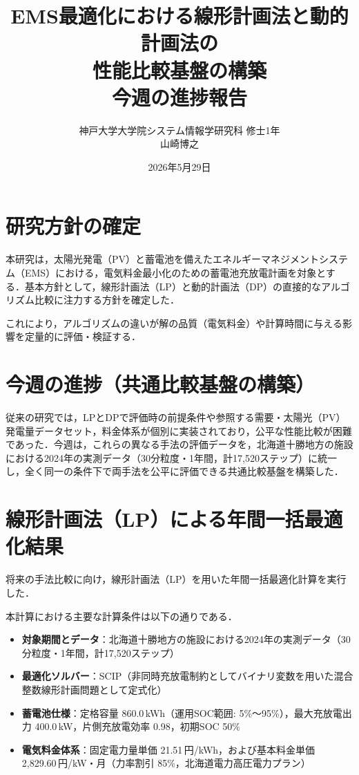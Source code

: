 \documentclass[a4paper,11pt,dvipdfmx]{jsarticle}
\title{EMS最適化における線形計画法と動的計画法の\\性能比較基盤の構築\\[0.5em]\large 今週の進捗報告}
\author{神戸大学大学院システム情報学研究科 修士1年\\山崎博之}
\date{2026年5月29日}
\begin{document}
\maketitle

\section{研究方針の確定}
本研究は，太陽光発電（PV）と蓄電池を備えたエネルギーマネジメントシステム（EMS）における，電気料金最小化のための蓄電池充放電計画を対象とする．基本方針として，線形計画法（LP）と動的計画法（DP）の直接的なアルゴリズム比較に注力する方針を確定した．

これにより，アルゴリズムの違いが解の品質（電気料金）や計算時間に与える影響を定量的に評価・検証する．

\section{今週の進捗（共通比較基盤の構築）}
従来の研究では，LPとDPで評価時の前提条件や参照する需要・太陽光（PV）発電量データセット，料金体系が個別に実装されており，公平な性能比較が困難であった．今週は，これらの異なる手法の評価データを，北海道十勝地方の施設における2024年の実測データ（30分粒度・1年間，計17,520ステップ）に統一し，全く同一の条件下で両手法を公平に評価できる共通比較基盤を構築した．

\section{線形計画法（LP）による年間一括最適化結果}
将来の手法比較に向け，線形計画法（LP）を用いた年間一括最適化計算を実行した．

本計算における主要な計算条件は以下の通りである．
\begin{itemize}
    \item \textbf{対象期間とデータ}：北海道十勝地方の施設における2024年の実測データ（30分粒度・1年間，計17,520ステップ）
    \item \textbf{最適化ソルバー}：SCIP（非同時充放電制約としてバイナリ変数を用いた混合整数線形計画問題として定式化）
    \item \textbf{蓄電池仕様}：定格容量 860.0\,kWh（運用SOC範囲: 5\%〜95\%），最大充放電出力 400.0\,kW，片側充放電効率 0.98，初期SOC 50\%
    \item \textbf{電気料金体系}：固定電力量単価 21.51\,円/kWh，および基本料金単価 2,829.60\,円/kW・月（力率割引 85\%，北海道電力高圧電力プラン）
\end{itemize}
\end{document}

